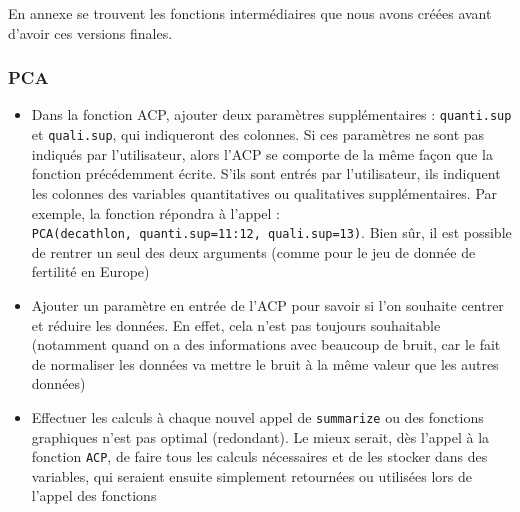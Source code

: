 \documentclass[
]{article}
\providecommand{\tightlist}{%
  \setlength{\itemsep}{0pt}\setlength{\parskip}{0pt}}
\begin{document}
En annexe se trouvent les fonctions intermédiaires que nous avons créées
avant d'avoir ces versions finales.

\hypertarget{pca}{%
\subsubsection{PCA}\label{pca}}

\begin{itemize}
\tightlist
\item
  Dans la fonction ACP, ajouter deux paramètres supplémentaires :
  \texttt{quanti.sup} et \texttt{quali.sup}, qui indiqueront des
  colonnes. Si ces paramètres ne sont pas indiqués par l'utilisateur,
  alors l'ACP se comporte de la même façon que la fonction précédemment
  écrite. S'ils sont entrés par l'utilisateur, ils indiquent les
  colonnes des variables quantitatives ou qualitatives supplémentaires.
  Par exemple, la fonction répondra à l'appel :
  \texttt{PCA(decathlon,\ quanti.sup=11:12,\ quali.sup=13)}. Bien sûr,
  il est possible de rentrer un seul des deux arguments (comme pour le
  jeu de donnée de fertilité en Europe)
\item
  Ajouter un paramètre en entrée de l'ACP pour savoir si l'on souhaite
  centrer et réduire les données. En effet, cela n'est pas toujours
  souhaitable (notamment quand on a des informations avec beaucoup de
  bruit, car le fait de normaliser les données va mettre le bruit à la
  même valeur que les autres données)
\item
  Effectuer les calculs à chaque nouvel appel de \texttt{summarize} ou
  des fonctions graphiques n'est pas optimal (redondant). Le mieux
  serait, dès l'appel à la fonction \texttt{ACP}, de faire tous les
  calculs nécessaires et de les stocker dans des variables, qui seraient
  ensuite simplement retournées ou utilisées lors de l'appel des
  fonctions
\end{itemize}
\end{document}
